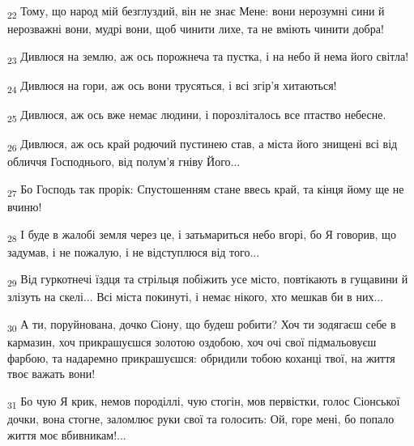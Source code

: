 \begin{tcolorbox}
\textsubscript{22} Тому, що народ мій безглуздий, він не знає Мене: вони нерозумні сини й нерозважні вони, мудрі вони, щоб чинити лихе, та не вміють чинити добра!
\end{tcolorbox}
\begin{tcolorbox}
\textsubscript{23} Дивлюся на землю, аж ось порожнеча та пустка, і на небо й нема його світла!
\end{tcolorbox}
\begin{tcolorbox}
\textsubscript{24} Дивлюся на гори, аж ось вони трусяться, і всі згір'я хитаються!
\end{tcolorbox}
\begin{tcolorbox}
\textsubscript{25} Дивлюся, аж ось вже немає людини, і порозліталось все птаство небесне.
\end{tcolorbox}
\begin{tcolorbox}
\textsubscript{26} Дивлюся, аж ось край родючий пустинею став, а міста його знищені всі від обличчя Господнього, від полум'я гніву Його...
\end{tcolorbox}
\begin{tcolorbox}
\textsubscript{27} Бо Господь так прорік: Спустошенням стане ввесь край, та кінця йому ще не вчиню!
\end{tcolorbox}
\begin{tcolorbox}
\textsubscript{28} І буде в жалобі земля через це, і затьмариться небо вгорі, бо Я говорив, що задумав, і не пожалую, і не відступлюся від того...
\end{tcolorbox}
\begin{tcolorbox}
\textsubscript{29} Від гуркотнечі їздця та стрільця побіжить усе місто, повтікають в гущавини й злізуть на скелі... Всі міста покинуті, і немає нікого, хто мешкав би в них...
\end{tcolorbox}
\begin{tcolorbox}
\textsubscript{30} А ти, поруйнована, дочко Сіону, що будеш робити? Хоч ти зодягаєш себе в кармазин, хоч прикрашуєшся золотою оздобою, хоч очі свої підмальовуєш фарбою, та надаремно прикрашуєшся: обридили тобою коханці твої, на життя твоє важать вони!
\end{tcolorbox}
\begin{tcolorbox}
\textsubscript{31} Бо чую Я крик, немов породіллі, чую стогін, мов первістки, голос Сіонської дочки, вона стогне, заломлює руки свої та голосить: Ой, горе мені, бо попало життя моє вбивникам!...
\end{tcolorbox}
